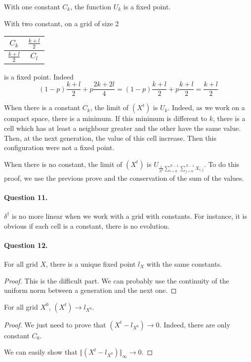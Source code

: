 With one constant $C_k$, the function $U_k$ is a fixed point.

With two constant, on a grid of size 2

\begin{tabular}{|c|c|}
\hline
$C_k$ & $\frac{k+l}{2}$\\
\hline
$\frac{k+l}{2}$ & $C_l$\\
\hline
\end{tabular}

is a fixed point. Indeed 
$$
    (1-p)\frac{k+l}{2} + p\frac{2k+2l}{4}=(1-p)\frac{k+l}{2} + p\frac{k+l}{2} = \frac{k+l}{2}
$$

When there is a constant $C_k$, the limit of $(X^t)$ is $U_k$. Indeed, as we work on a compact space, there is a minimum. If this minimum is different to $k$, there is a cell which has at least a neighbour greater and the other have the same value. Then, at the next generation, the value of this cell increase. Then this configuration were not a fixed point.

When there is no constant, the limit of $(X^t)$ is $U_{\frac{1}{N^2}\sum\limits_{i=0}^{N-1} \sum\limits_{j=0}^{N-1} X_{i,j}}$. To do this proof, we use the previous prove and the conservation of the sum of the values.

\paragraph{Question 11.}

$\delta^\dagger$ is no more linear when we work with a grid with constants. For instance, it is obvious if each cell is a constant, there is no evolution.

\paragraph{Question 12.}

\begin{lemma}
    For all grid $X$, there is a unique fixed point $l_X$ with the same constants.
\end{lemma}
\begin{proof}
    This is the difficult part. We can probably use the continuity of the uniform norm between a generation and the next one.
\end{proof}

\begin{lemma}
    For all grid $X^0$, $(X^t) \to l_{X^0}$.
\end{lemma}
\begin{proof}
    We just need to prove that $(X^t-l_{X^0}) \to 0$. Indeed, there are only constant $C_0$.
    
    We can easily show that $\Vert (X^t-l_{X^0}) \Vert_\infty \to 0$.
\end{proof}


